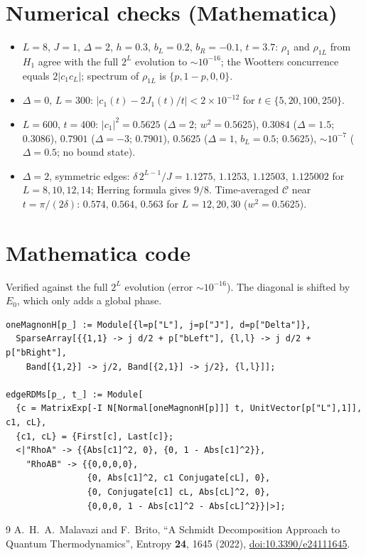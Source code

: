 \documentclass[11pt]{article}
\begin{document}
\section{Numerical checks (Mathematica)}
\begin{itemize}
\item $L=8$, $J=1$, $\Delta=2$, $h=0.3$, $b_L=0.2$, $b_R=-0.1$, $t=3.7$: $\rho_1$ and $\rho_{1L}$ from $H_1$ agree with the full $2^L$ evolution to $\sim10^{-16}$; the Wootters concurrence equals $2|c_1c_L|$; spectrum of $\rho_{1L}$ is $\{p,1-p,0,0\}$.
\item $\Delta=0$, $L=300$: $|c_1(t)-2J_1(t)/t|<2\times10^{-12}$ for $t\in\{5,20,100,250\}$.
\item $L=600$, $t=400$: $|c_1|^2=0.5625$ ($\Delta=2$; $w^2=0.5625$), $0.3084$ ($\Delta=1.5$; $0.3086$), $0.7901$ ($\Delta=-3$; $0.7901$), $0.5625$ ($\Delta=1$, $b_L=0.5$; $0.5625$), $\sim10^{-7}$ ($\Delta=0.5$; no bound state).
\item $\Delta=2$, symmetric edges: $\delta\,2^{L-1}/J=1.1275,\,1.1253,\,1.12503,\,1.125002$ for $L=8,10,12,14$; Herring formula gives $9/8$. Time-averaged $\mathcal C$ near $t=\pi/(2\delta)$: $0.574,\,0.564,\,0.563$ for $L=12,20,30$ ($w^2=0.5625$).
\end{itemize}

\appendix
\section{Mathematica code}
Verified against the full $2^L$ evolution (error $\sim10^{-16}$). The diagonal is shifted by $E_0$, which only adds a global phase.
\begin{lstlisting}
oneMagnonH[p_] := Module[{l=p["L"], j=p["J"], d=p["Delta"]},
  SparseArray[{{1,1} -> j d/2 + p["bLeft"], {l,l} -> j d/2 + p["bRight"],
    Band[{1,2}] -> j/2, Band[{2,1}] -> j/2}, {l,l}]];

edgeRDMs[p_, t_] := Module[
  {c = MatrixExp[-I N[Normal[oneMagnonH[p]]] t, UnitVector[p["L"],1]], c1, cL},
  {c1, cL} = {First[c], Last[c]};
  <|"RhoA" -> {{Abs[c1]^2, 0}, {0, 1 - Abs[c1]^2}},
    "RhoAB" -> {{0,0,0,0},
                {0, Abs[c1]^2, c1 Conjugate[cL], 0},
                {0, Conjugate[c1] cL, Abs[cL]^2, 0},
                {0,0,0, 1 - Abs[c1]^2 - Abs[cL]^2}}|>];
\end{lstlisting}

\begin{thebibliography}{9}
 A.~H.~A.~Malavazi and F.~Brito, ``A Schmidt Decomposition Approach to Quantum Thermodynamics'', Entropy \textbf{24}, 1645 (2022), \href{https://doi.org/10.3390/e24111645}{doi:10.3390/e24111645}.
\end{thebibliography}
\end{document}
